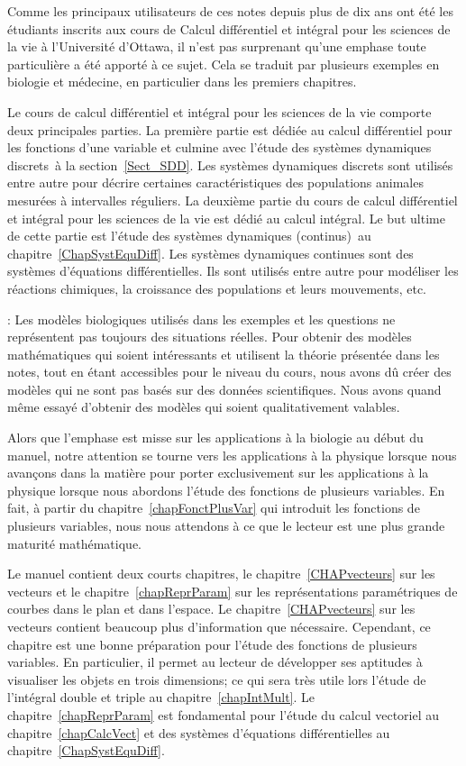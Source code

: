 Comme les principaux utilisateurs de ces notes depuis plus de dix ans
ont été les étudiants inscrits aux cours de Calcul différentiel et
intégral pour les sciences de la vie à l'Université d'Ottawa, il n'est
pas surprenant qu'une emphase toute particulière a été apporté à ce
sujet.  Cela se traduit par plusieurs exemples en biologie et
médecine, en particulier dans les premiers chapitres.

Le cours de calcul différentiel et intégral pour les sciences de la
vie comporte deux principales parties.  La première partie
est dédiée au calcul différentiel pour les fonctions d'une variable et
culmine avec l'étude des \lgm systèmes dynamiques discrets\rgm\ à la
section~\ref{Sect_SDD}.  Les systèmes dynamiques discrets sont
utilisés entre autre pour décrire certaines caractéristiques des
populations animales mesurées à intervalles réguliers.
La deuxième partie du cours de calcul différentiel et intégral pour
les sciences de la vie est dédié au calcul intégral.  Le but ultime de
cette partie est l'étude des \lgm systèmes dynamiques (continus)\rgm\ 
au chapitre~\ref{ChapSystEquDiff}.  Les systèmes dynamiques continues
sont des systèmes d'équations différentielles.  Ils sont utilisés
entre autre pour modéliser les réactions chimiques, la croissance des
populations et leurs mouvements, etc.

: Les modèles biologiques utilisés
dans les exemples et les questions ne représentent pas toujours des
situations réelles.  Pour obtenir des modèles mathématiques qui soient
intéressants et utilisent la théorie présentée dans les notes, tout en
étant accessibles pour le niveau du cours, nous avons dû créer des
modèles qui ne sont pas basés sur des données scientifiques.  Nous
avons quand même essayé d'obtenir des modèles qui soient qualitativement
valables.

Alors que l'emphase est misse sur les applications à la biologie au
début du manuel, notre attention se tourne vers les applications à la
physique lorsque nous avançons dans la matière pour porter exclusivement
sur les applications à la physique lorsque nous abordons l'étude des
fonctions de plusieurs variables.  En fait, à partir du
chapitre~\ref{chapFonctPlusVar} qui introduit les fonctions de
plusieurs variables, nous nous attendons à ce que le lecteur est
une plus grande maturité mathématique.

Le manuel contient deux courts chapitres, le
chapitre~\ref{CHAPvecteurs} sur les vecteurs et le
chapitre~\ref{chapReprParam} sur les représentations paramétriques de
courbes dans le plan et dans l'espace.  Le
chapitre~\ref{CHAPvecteurs} sur les vecteurs contient beaucoup plus
d'information que nécessaire.  Cependant, ce chapitre est une bonne
préparation pour l'étude des fonctions de plusieurs variables.  En
particulier, il permet au lecteur de développer ses aptitudes à
visualiser les objets en trois dimensions; ce qui sera très utile lors
l'étude de l'intégral double et triple au chapitre~\ref{chapIntMult}.
Le chapitre~\ref{chapReprParam} est fondamental pour l'étude du calcul
vectoriel au chapitre~\ref{chapCalcVect} et des systèmes d'équations
différentielles au chapitre~\ref{ChapSystEquDiff}.

